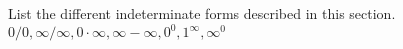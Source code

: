 {List the different indeterminate forms described in this section.}
{$0/0, \infty/\infty, 0\cdot\infty,\infty-\infty,0^0,1^\infty,\infty^0$}
